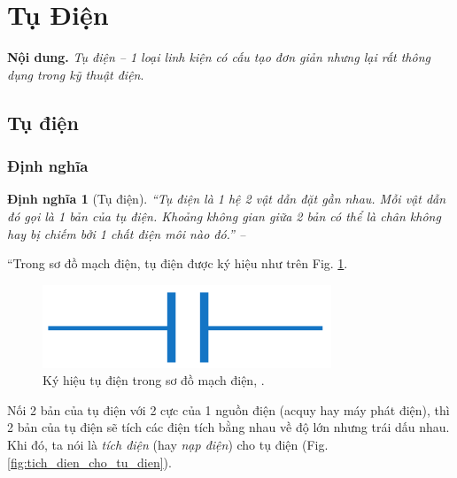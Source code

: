\documentclass[oneside]{book}
\numberwithin{equation}{section}
\newtheorem{dinhnghia}{Định nghĩa}[section]
\begin{document}

\section{Tụ Điện}
\textbf{Nội dung.} \textit{Tụ điện -- 1 loại linh kiện có cấu tạo đơn giản nhưng lại rất thông dụng trong kỹ thuật điện}.

\subsection{Tụ điện}

\subsubsection{Định nghĩa}

\begin{dinhnghia}[Tụ điện]
	``\emph{Tụ điện} là 1 hệ 2 vật dẫn đặt gần nhau. Mỗi vật dẫn đó gọi là 1 bản của tụ điện. Khoảng không gian giữa 2 bản có thể là chân không hay bị chiếm bởi 1 chất điện môi nào đó.'' -- \cite[p. 32]{SGK_Vat_Ly_11_nang_cao}
\end{dinhnghia}
``Trong sơ đồ mạch điện, tụ điện được ký hiệu như trên Fig. \ref{fig:ky_hieu_tu_dien}.

\begin{figure}[H]
	\centering
	\includegraphics[scale=0.15]{ky_hieu_tu_dien}
	\caption{Ký hiệu tụ điện trong sơ đồ mạch điện, \cite[Hình 7.1, p. 32]{SGK_Vat_Ly_11_nang_cao}.}
	\label{fig:ky_hieu_tu_dien}
\end{figure}
Nối 2 bản của tụ điện với 2 cực của 1 nguồn điện (acquy hay máy phát điện), thì 2 bản của tụ điện sẽ tích các điện tích bằng nhau về độ lớn nhưng trái dấu nhau. Khi đó, ta nói là \textit{tích điện} (hay \textit{nạp điện}) cho tụ điện (Fig. \ref{fig:tich_dien_cho_tu_dien}).
\end{document}
